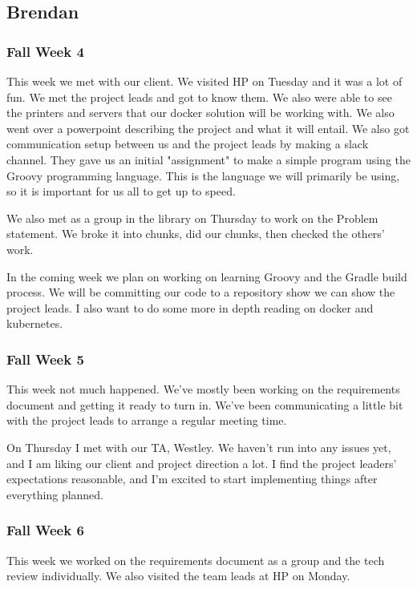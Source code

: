 \documentclass[onecolumn, draftclsnofoot,10pt, compsoc]{IEEEtran}
\begin{document}
\subsection{Brendan}
\subsubsection*{Fall Week 4}
This week we met with our client.  We visited HP on Tuesday and it was a lot of fun.  We met the project leads and got to know them.  We also were able to see the printers and servers that our docker solution will be working with. 
We also went over a powerpoint describing the project and what it will entail.  We also got communication setup between us and the project leads by making a slack channel.  They gave us an initial "assignment" to make a simple program using the Groovy programming language.  This is the language we will primarily be using, so it is important for us all to get up to speed.

We also met as a group in the library on Thursday to work on the Problem statement.  We broke it into chunks, did our chunks, then checked the others' work. 

In the coming week we plan on working on learning Groovy and the Gradle build process.  We will be committing our code to a repository show we can show the project leads.   I also want to do some more in depth reading on docker and kubernetes.

\subsubsection*{Fall Week 5}
This week not much happened.
We've mostly been working on the requirements document and getting it ready to turn in.
We've been communicating a little bit with the project leads to arrange a regular meeting time. 

On Thursday I met with our TA, Westley.
We haven't run into any issues yet, and I am liking our client and project direction a lot.
I find the project leaders' expectations reasonable, and I'm excited to start implementing things after everything planned.

\subsubsection*{Fall Week 6}
This week we worked on the requirements document as a group and the tech review individually.
We also visited the team leads at HP on Monday.
\end{document}
